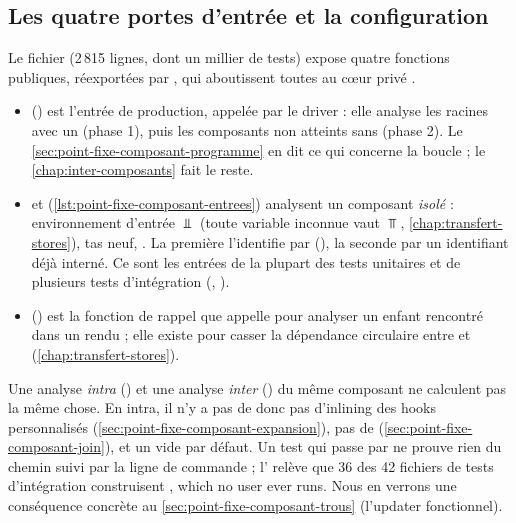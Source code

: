 \subsection{Les quatre portes d'entrée et la configuration}

Le fichier  (2\,815 lignes, dont un millier de
tests) expose quatre fonctions publiques, réexportées par
, qui aboutissent toutes au cœur privé
.


\begin{itemize}
  \item {} () est
    l'entrée de production, appelée par le driver : elle analyse les racines
    avec un  (phase 1), puis les composants non atteints sans
    (phase 2). Le \cref{sec:point-fixe-composant-programme} en dit ce qui
    concerne la boucle ; le \cref{chap:inter-composants} fait le reste.
  \item {} et 
    (\cref{lst:point-fixe-composant-entrees}) analysent un composant
    \emph{isolé} : environnement d'entrée $\Bot$ (toute variable inconnue vaut
    $\Top$, \cref{chap:transfert-stores}), tas neuf, . La première
    l'identifie par 
    (), la seconde par un identifiant déjà
    interné. Ce sont les entrées de la plupart des tests unitaires et de
    plusieurs tests d'intégration (,
    ).
  \item {} ()
    est la fonction de rappel que  appelle pour analyser
    un enfant rencontré dans un rendu ; elle existe pour casser la dépendance
    circulaire entre  et 
    (\cref{chap:transfert-stores}).
\end{itemize}

\begin{piege}
Une analyse \emph{intra} () et une analyse
\emph{inter} () du même composant ne calculent pas la
même chose. En intra, il n'y a pas de  donc pas d'inlining
des hooks personnalisés (\cref{sec:point-fixe-composant-expansion}), pas de
 (\cref{sec:point-fixe-composant-join}), et un
 vide par défaut. Un test qui passe par
 ne prouve rien du chemin suivi par la ligne de
commande ; l' relève que 36 des 42 fichiers de tests d'intégration
construisent , \og which no user ever runs\fg. Nous
en verrons une conséquence concrète au
\cref{sec:point-fixe-composant-trous} (l'updater fonctionnel).
\end{piege}

